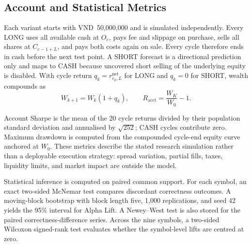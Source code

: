 \clearpage
\subsection{Account and Statistical Metrics}

Each variant starts with VND~50,000,000 and is simulated independently. Every LONG uses all available cash at $O_e$, pays fee and slippage on purchase, sells all shares at $C_{e-1+L}$, and pays both costs again on sale. Every cycle therefore ends in cash before the next test point. A SHORT forecast is a directional prediction only and maps to CASH because uncovered short selling of the underlying equity is disabled. With cycle return $q_k=r^{\mathrm{net}}_{e_k,L}$ for LONG and $q_k=0$ for SHORT, wealth compounds as
\begin{equation}
 W_{k+1}=W_k(1+q_k),\qquad
 R_{\mathrm{acct}}=\frac{W_K}{W_0}-1.
 \label{eq:account_return_setup}
\end{equation}

Account Sharpe is the mean of the 20 cycle returns divided by their population standard deviation and annualised by $\sqrt{252}$; CASH cycles contribute zero. Maximum drawdown is computed from the compounded cycle-end equity curve anchored at $W_0$. These metrics describe the stated research simulation rather than a deployable execution strategy: spread variation, partial fills, taxes, liquidity limits, and market impact are outside the model.

Statistical inference is computed on paired common support. For each symbol, an exact two-sided McNemar test compares discordant correctness outcomes. A moving-block bootstrap with block length five, 1,000 replications, and seed 42 yields the 95\% interval for Alpha Lift. A Newey--West test is also stored for the paired correctness-difference series. Across the nine symbols, a two-sided Wilcoxon signed-rank test evaluates whether the symbol-level lifts are centred at zero.

